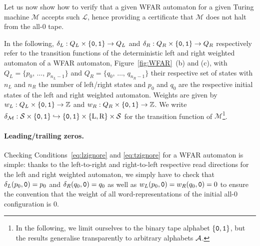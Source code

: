 Let us now show how to verify that a given WFAR automaton for a given Turing machine $\mathcal{M}$ accepts such $\mathcal{L}$, hence providing a certificate that $\mathcal{M}$ does not halt from the all-0 tape.

In the following, $\delta_L: Q_L \times \left\{\texttt{0},\texttt{1}\right\} \to Q_L$ and $\delta_R: Q_R \times \left\{\texttt{0},\texttt{1}\right\} \to Q_R$ respectively refer to the transition functions of the deterministic left and right weighted automaton of a WFAR automaton, \eg Figure~\ref{fig:WFAR}~(b) and (c), with $Q_L = \{p_0, \, \dots, \, p_{n_L-1}\}$ and $Q_R = \{q_0, \, \dots, \, q_{n_R-1}\}$ their respective set of states with $n_L$ and $n_R$ the number of left/right states and $p_0$ and $q_0$ are the respective initial states of the left and right weighted automaton. Weights are given by $w_L: Q_L \times \left\{\texttt{0},\texttt{1}\right\} \to \mathbb{Z}$ and $w_R: Q_R \times \left\{\texttt{0},\texttt{1}\right\} \to \mathbb{Z}$. We write $\delta_\mathcal{M}:\mathcal{S} \times \left\{\texttt{0},\texttt{1}\right\} \hookrightarrow \left\{\texttt{0},\texttt{1}\right\} \times \{\text{L},\text{R}\} \times \mathcal{S}$ for the transition function of $\mathcal{M}$\footnote{In the following, we limit ourselves to the binary tape alphabet $\left\{\texttt{0},\texttt{1}\right\}$, but the results generalise transparently to arbitrary alphabets $\mathcal{A}$.}.

\paragraph{Leading/trailing zeros.} Checking Conditions~\eqref{eq:lzignore} and \eqref{eq:tzignore} for a WFAR automaton is simple: thanks to the left-to-right and right-to-left respective read directions for the left and right weighted automaton, we simply have to check that $\delta_L(p_0,\texttt{0}) = p_0$ and $\delta_R(q_0,\texttt{0}) = q_0$ as well as $w_L(p_0,\texttt{0}) = w_R(q_0,\texttt{0}) = 0$ to ensure the convention that the weight of all word-representations of the initial all-0 configuration is 0.

